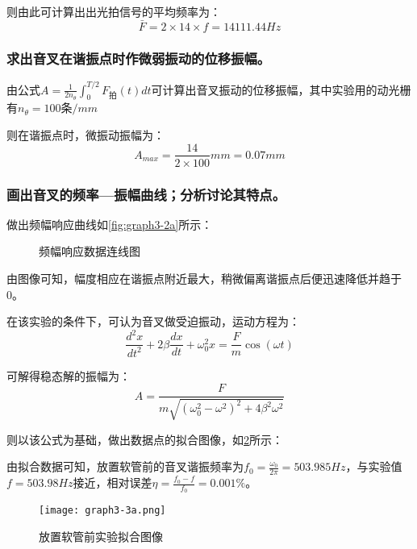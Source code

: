 \documentclass[dvipsnames, svgnames,a4paper,11pt]{article}
\begin{document}
	则由此可计算出出光拍信号的平均频率为：
	\[
		\bar{F}=2\times14\times f=14111.44Hz
	\]





	\subsubsection{求出音叉在谐振点时作微弱振动的位移振幅。}


	由公式$ A =\frac{1}{2n_\theta} \int_0^{T/2} F_{拍}(t)  dt $可计算出音叉振动的位移振幅，其中实验用的动光栅有$n_\theta=100条/mm$

	则在谐振点时，微振动振幅为：
	\[
		A_{max}=\frac{14}{2\times100}mm=0.07mm	
	\]




	\subsubsection{画出音叉的频率—振幅曲线；分析讨论其特点。}




	做出频幅响应曲线如\cref{fig:graph3-2a}所示：


	\begin{figure}[htbp]
		\centering
		\quad
		\quad
		\caption{频幅响应数据连线图}
		\label{fig:graph10}
	\end{figure}



	由图像可知，幅度相应在谐振点附近最大，稍微偏离谐振点后便迅速降低并趋于0。



	在该实验的条件下，可认为音叉做受迫振动，运动方程为：
	\[
	\frac{d^2x}{dt^2}+2\beta\frac{dx}{dt}+\omega_0^2x=\frac{F}{m}\cos(\omega t)	
	\]

	可解得稳态解的振幅为：
	\[
	A=\frac{F}{m\sqrt{(\omega_0^2-\omega^2)^2+4\beta^2\omega^2}}	
	\]

	则以该公式为基础，做出数据点的拟合图像，如\cref{fig:graph3-3a}所示：

	由拟合数据可知，放置软管前的音叉谐振频率为$f_0=\frac{\omega_0}{2\pi}=503.985Hz$，与实验值$f=503.98Hz$接近，相对误差$\eta=\frac{f_0-f}{f_0}=0.001\%$。

	\begin{figure}[htbp]
		\centering
		\texttt{[image: graph3-3a.png]}\label{fig:graph3-3a}
		\caption{放置软管前实验拟合图像}
	\end{figure}
		
\end{document}
